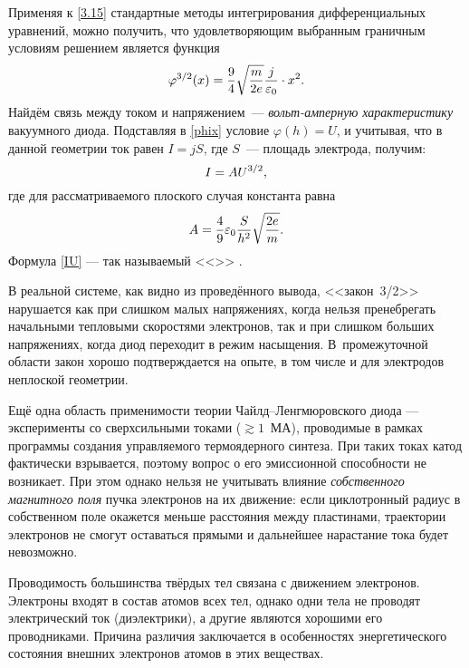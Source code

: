 Применяя к \eqref{3.15} стандартные методы интегрирования дифференциальных
уравнений, можно получить, что удовлетворяющим выбранным граничным условиям
решением является функция
\begin{equation}
\eqmark{phix}
    \varphi^{3/2}(x) = 
    \frac{9}{4}\sqrt{\frac{m}{2e}}\frac{j}{\varepsilon_0} \cdot x^2.
\end{equation}
Найдём связь между током и напряжением~---
\emph{вольт-амперную характеристику} вакуумного диода.
Подставляя в \eqref{phix} условие $\varphi(h)=U$, 
и учитывая, что в данной геометрии ток равен $I=jS$, 
где $S$~--- площадь электрода, получим:
\begin{equation}
\eqmark{IU}
    I = A U^{3/2},
\end{equation}
где для рассматриваемого плоского случая константа равна 
\begin{equation}\eqmark{IU_flat}
A=\frac{4}{9}\varepsilon_0\frac{S}{h^2}\sqrt{\frac{2e}{m}}.
\end{equation}
Формула \eqref{IU} --- так называемый <<>> .


В реальной системе, как видно из проведённого вывода, <<закон~3/2>>
нарушается как при слишком малых напряжениях, когда нельзя пренебрегать
начальными тепловыми скоростями электронов, так и при слишком больших
напряжениях, когда диод переходит в режим насыщения. В~промежуточной
области закон хорошо подтверждается на опыте, в том числе и для
электродов неплоской геометрии.

\begin{lab:note}
Ещё одна область применимости теории Чайлд--Ленгмюровского диода ---
эксперименты со сверхсильными токами ($\gtrsim 1$~МА),
проводимые в рамках программы создания управляемого
термоядерного синтеза. При таких токах катод фактически взрывается, поэтому
вопрос о его эмиссионной способности не возникает. При этом однако нельзя
не учитывать влияние \emph{собственного магнитного поля} пучка электронов
на их движение: если циклотронный радиус в собственном поле окажется
меньше расстояния между пластинами, траектории электронов не смогут
оставаться прямыми и дальнейшее нарастание тока будет невозможно.
\end{lab:note}



Проводимость большинства твёрдых тел связана с движением электронов. Электроны
входят в состав атомов всех тел, однако одни тела не проводят электрический ток
(диэлектрики), а другие являются хорошими его проводниками. Причина различия
заключается в особенностях энергетического состояния внешних электронов атомов в
этих веществах.


